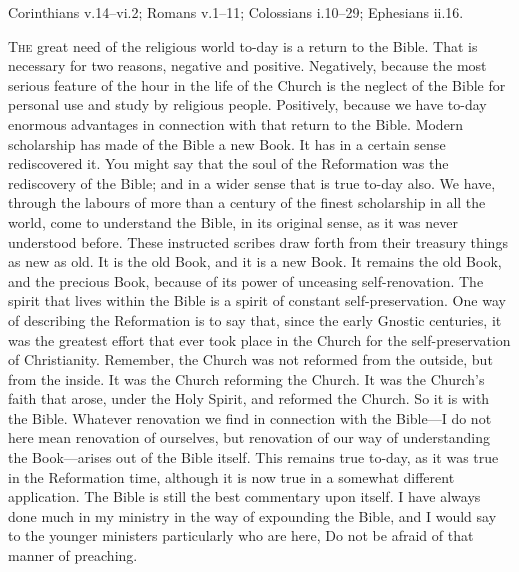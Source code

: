 \documentclass[12pt,a5paper,twoside,titlepage]{book}
\begin{document}




\begin{center}
Corinthians v.14--vi.2; Romans v.1--11; Colossians i.10--29;
Ephesians ii.16. 
\end{center}


\textsc{The} great need of the religious world to-day 
is a return to the Bible. That is necessary 
for two reasons, negative and positive. Negatively,
because the most serious feature of the 
hour in the life of the Church is the neglect of 
the Bible for personal use and study by religious 
people. Positively, because we have to-day enormous 
advantages in connection with that return 
to the Bible. Modern scholarship has made of 
the Bible a new Book. It has in a certain sense 
rediscovered it. You might say that the soul 
of the Reformation was the rediscovery of the 
Bible; and in a wider sense that is true to-day 
also. We have, through the labours of more 
than a century of the finest scholarship in all 
the world, come to understand the Bible, in 
its original sense, as it was never understood 
before. These instructed scribes draw forth 
from their treasury things as new as old. It 
is the old Book, and it is a new Book. It 
remains the old Book, and the precious Book, 
because of its power of unceasing self-renovation. 
The spirit that lives within the Bible is 
a spirit of constant self-preservation. One way 
of describing the Reformation is to say that, 
since the early Gnostic centuries, it was the 
greatest effort that ever took place in the 
Church for the self-preservation of Christianity. 
Remember, the Church was not reformed from 
the outside, but from the inside. It was the 
Church reforming the Church. It was the 
Church's faith that arose, under the Holy Spirit, 
and reformed the Church. So it is with the 
Bible. Whatever renovation we find in connection 
with the Bible---I do not here mean renovation 
of ourselves, but renovation of our way of 
understanding the Book---arises out of the Bible 
itself. This remains true to-day, as it was true 
in the Reformation time, although it is now 
true in a somewhat different application. The 
Bible is still the best commentary upon itself. 
I have always done much in my ministry in 
the way of expounding the Bible, and I would 
say to the younger ministers particularly who are 
here, Do not be afraid of that manner of preaching. 
\end{document}
